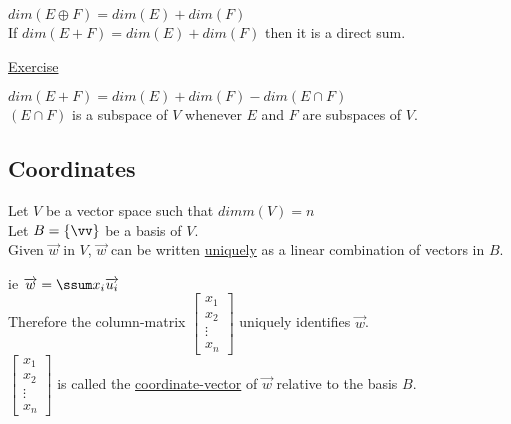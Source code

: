 \documentclass[12pt]{article}
\renewcommand{\v}[1]{\overrightarrow{#1}}
\newcommand\m[1]{\begin{bmatrix}#1\end{bmatrix}}
\newenvironment{block}[1][Label]{\underline{#1}\par}{}
\newcommand{\bb}[1]{\left\{#1\right\}}
\begin{document}
$dim(E \oplus F) = dim(E) + dim(F)$ \\
If $dim(E + F) = dim(E) + dim(F)$ then it is a direct sum.

\begin{block}[Exercise]
$dim(E + F) = dim(E) + dim(F) - dim(E \cap F)$ \\
$(E \cap F)$ is a subspace of $V$ whenever $E$ and $F$ are subspaces of $V$.
\end{block}

\subsection{Coordinates}

Let $V$ be a vector space such that $dimm(V) = n$ \\
Let $B = \bb{\vv}$ be a basis of $V$. \\
Given $\v{w}$ in $V$, $\v{w}$ can be written \underline{uniquely} as a linear combination of vectors in $B$.

ie $\v{w} = \ssum x_i \v{u_i}$ \\

Therefore the column-matrix $\m{x_1 \\ x_2 \\ \vdots \\ x_n}$ uniquely identifies $\v{w}$. \\

$\m{x_1 \\ x_2 \\ \vdots \\ x_n}$ is called the \underline{coordinate-vector} of $\v{w}$ relative to the basis $B$.
\end{document}
